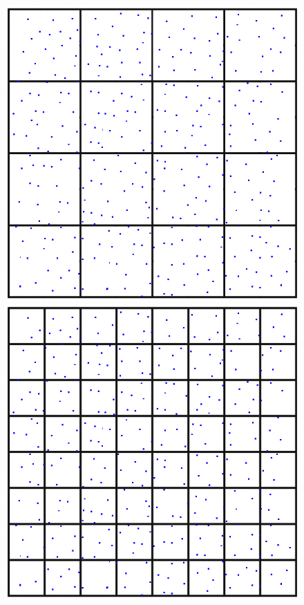 \documentclass[11pt, oneside]{article}   	%
\begin{document}
\begin{figure}[h]
\includegraphics[scale=0.25]{./images/b2}
\includegraphics[scale=0.25]{./images/b3}
\end{figure}
\end{document}

